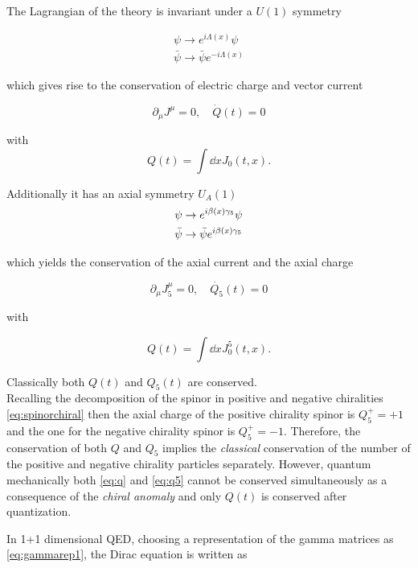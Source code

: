 The Lagrangian of the theory is invariant under a $U(1)$ symmetry 

\begin{align}
    \psi\to e^{i\Lambda(x)}\psi \nonumber\\
    \bar\psi \to \bar\psi e^{-i\Lambda(x)}
\end{align}

which gives rise to the conservation of electric charge and vector current

\begin{equation}
    \partial_\mu J^\mu = 0,\quad \dot{Q}(t) = 0
\end{equation}

with
\begin{equation}
    Q(t) = \int \dd{x} J_0(t,x)\label{eq:q}.
\end{equation}

Additionally it has an axial symmetry $U_A(1)$ 
\begin{align}
    \psi\to e^{i\beta(x)\gamma_5}\psi\nonumber\\
    \bar\psi \to \bar\psi e^{i\beta(x)\gamma_5}
\end{align}

which yields the conservation of the axial current and the axial charge

\begin{equation}
    \partial_\mu J_5^\mu = 0,\quad \dot{Q_5}(t) = 0
\end{equation}

with

\begin{equation}
    Q(t) = \int \dd{x} J^5_0(t,x).\label{eq:q5}
\end{equation}

Classically both $Q(t)$ and $Q_5(t)$ are conserved.\\

Recalling the decomposition of the spinor in positive and negative chiralities \eqref{eq:spinorchiral} then the axial charge of the positive chirality spinor is $Q_5^+ = +1$ and the one for the negative chirality spinor is $Q_5^+ = -1$. Therefore, the conservation of both $Q$ and $Q_5$ implies the \emph{classical} conservation of the number of the positive and negative chirality particles separately. However, quantum mechanically both \eqref{eq:q} and \eqref{eq:q5} cannot be conserved simultaneously as a consequence of the \emph{chiral anomaly} and only $Q(t)$ is conserved after quantization.


In 1+1 dimensional QED, choosing a representation of the gamma matrices as \eqref{eq:gammarep1}, the Dirac equation is written as

